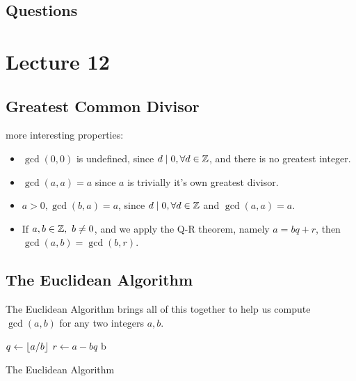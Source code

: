 \documentclass{report}
\begin{document}
\subsection*{Questions}
\qs{}{}

\newpage
\section{Lecture 12}
\subsection*{Greatest Common Divisor}
		
more interesting properties:
\begin{itemize}
	\item $\gcd(0,0)$ is undefined, since $d\mathrel{\mid} 0, \forall d\in\mathbb{Z}$, and there is no greatest integer.
	\item $\gcd(a,a) = a$ since $a$ is trivially it's own greatest divisor.
	\item $a>0,\gcd(b,a) = a$, since $d\mathrel{\mid} 0, \forall d\in\mathbb{Z}$ and $\gcd(a,a)=a$.
	\item If $a,b\in\mathbb{Z},\ b\neq0$, and we apply the Q-R theorem, namely $a = bq+r$, then $\gcd(a,b) = \gcd(b,r)$.
\end{itemize}
\subsection*{The Euclidean Algorithm}
		The Euclidean Algorithm brings all of this together to help us compute $\gcd(a,b)$ for any two integers $a,b$.
		\begin{algorithm}[H]
			\SetAlgoLined
	\SetNoFillComment
	\vspace{3mm}
	$q \leftarrow \left\lfloor a/b \right\rfloor$\;
	$r \leftarrow a - bq$\;
	 {
		\Return b\;
	}
	\caption{The Euclidean Algorithm}
\end{algorithm}
\end{document}

